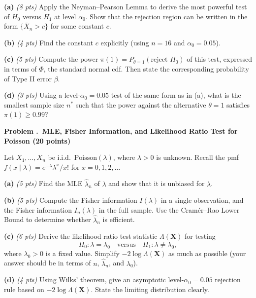 \documentclass[11pt]{article}
\newcounter{probnum}
\newcommand{\prob}[2]{%
  \stepcounter{probnum}%
  \bigskip
  \noindent\textbf{Problem \theprobnum.\ #2 \hfill (#1 points)}\par\nobreak
}
\newcommand{\partlabel}[2]{\medskip\noindent\textbf{(#1)} \emph{(#2 pts)}\quad}
\begin{document}
\partlabel{a}{8}
Apply the Neyman--Pearson Lemma to derive the most powerful test of $H_0$ versus $H_1$ at level $\alpha_0$. Show that the rejection region can be written in the form $\{\bar{X}_n > c\}$ for some constant $c$.

\vspace{4cm}

\partlabel{b}{4}
Find the constant $c$ explicitly (using $n = 16$ and $\alpha_0 = 0.05$).

\vspace{2.5cm}

\partlabel{c}{5}
Compute the power $\pi(1) = P_{\theta=1}(\text{reject } H_0)$ of this test, expressed in terms of $\Phi$, the standard normal cdf. Then state the corresponding probability of Type II error $\beta$.

\vspace{3cm}

\partlabel{d}{3}
Using a level-$\alpha_0 = 0.05$ test of the same form as in (a), what is the smallest sample size $n^*$ such that the power against the alternative $\theta = 1$ satisfies $\pi(1) \geq 0.99$?

\vfill
\newpage

\prob{20}{MLE, Fisher Information, and Likelihood Ratio Test for Poisson}
Let $X_1, \dots, X_n$ be i.i.d.\ $\mathrm{Poisson}(\lambda)$, where $\lambda > 0$ is unknown. Recall the pmf $f(x \mid \lambda) = e^{-\lambda} \lambda^x / x!$ for $x = 0, 1, 2, \dots$

\partlabel{a}{5}
Find the MLE $\widehat{\lambda}_n$ of $\lambda$ and show that it is unbiased for $\lambda$.

\vspace{2.5cm}

\partlabel{b}{5}
Compute the Fisher information $I(\lambda)$ in a single observation, and the Fisher information $I_n(\lambda)$ in the full sample. Use the Cram\'er--Rao Lower Bound to determine whether $\widehat{\lambda}_n$ is efficient.

\vspace{3.5cm}

\partlabel{c}{6}
Derive the likelihood ratio test statistic $\Lambda(\mathbf{X})$ for testing
\[
H_0: \lambda = \lambda_0 \quad \text{versus} \quad H_1: \lambda \neq \lambda_0,
\]
where $\lambda_0 > 0$ is a fixed value. Simplify $-2 \log \Lambda(\mathbf{X})$ as much as possible (your answer should be in terms of $n$, $\widehat{\lambda}_n$, and $\lambda_0$).

\vspace{4cm}

\partlabel{d}{4}
Using Wilks' theorem, give an asymptotic level-$\alpha_0 = 0.05$ rejection rule based on $-2\log\Lambda(\mathbf{X})$. State the limiting distribution clearly.

\vfill
\end{document}
